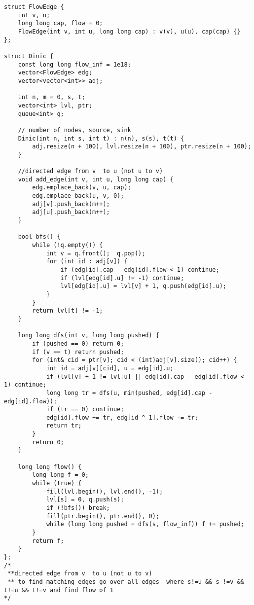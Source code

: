 \documentclass[FSZ,a4paper,onesided]{article}
\begin{document}
\begin{multicols*}{\COLS}
\begin{lstlisting}
struct FlowEdge {
    int v, u;
    long long cap, flow = 0;
    FlowEdge(int v, int u, long long cap) : v(v), u(u), cap(cap) {}
};

struct Dinic {
    const long long flow_inf = 1e18;
    vector<FlowEdge> edg;
    vector<vector<int>> adj;

    int n, m = 0, s, t;
    vector<int> lvl, ptr;
    queue<int> q;
    
    // number of nodes, source, sink
    Dinic(int n, int s, int t) : n(n), s(s), t(t) {
        adj.resize(n + 100), lvl.resize(n + 100), ptr.resize(n + 100);
    }
    
    //directed edge from v  to u (not u to v)
    void add_edge(int v, int u, long long cap) {
        edg.emplace_back(v, u, cap);
        edg.emplace_back(u, v, 0);
        adj[v].push_back(m++);
        adj[u].push_back(m++);
    }

    bool bfs() {
        while (!q.empty()) {
            int v = q.front();  q.pop();
            for (int id : adj[v]) {
                if (edg[id].cap - edg[id].flow < 1) continue;
                if (lvl[edg[id].u] != -1) continue;
                lvl[edg[id].u] = lvl[v] + 1, q.push(edg[id].u);
            }
        }
        return lvl[t] != -1;
    }

    long long dfs(int v, long long pushed) {
        if (pushed == 0) return 0;
        if (v == t) return pushed;
        for (int& cid = ptr[v]; cid < (int)adj[v].size(); cid++) {
            int id = adj[v][cid], u = edg[id].u;
            if (lvl[v] + 1 != lvl[u] || edg[id].cap - edg[id].flow < 1) continue;
            long long tr = dfs(u, min(pushed, edg[id].cap - edg[id].flow));
            if (tr == 0) continue;
            edg[id].flow += tr, edg[id ^ 1].flow -= tr;
            return tr;
        }
        return 0;
    }

    long long flow() {
        long long f = 0;
        while (true) {
            fill(lvl.begin(), lvl.end(), -1);
            lvl[s] = 0, q.push(s);
            if (!bfs()) break;
            fill(ptr.begin(), ptr.end(), 0);
            while (long long pushed = dfs(s, flow_inf)) f += pushed;
        }
        return f;
    }
};
/*
 **directed edge from v  to u (not u to v)
 ** to find matching edges go over all edges  where s!=u && s !=v && t!=u && t!=v and find flow of 1 
*/
\end{lstlisting}

\end{multicols*}
\end{document}
